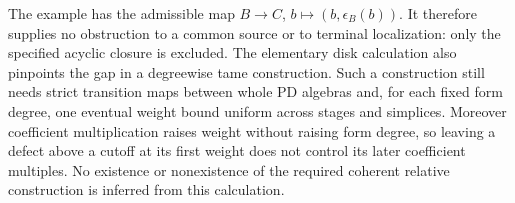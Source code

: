 The example has the admissible map
$B\to C$, $b\mapsto(b,\epsilon_B(b))$.
It therefore supplies no obstruction to a common source
or to terminal localization: only the specified acyclic
closure is excluded. The elementary disk calculation also
pinpoints the gap in a degreewise tame construction. Such a
construction still needs strict transition maps between whole
PD algebras and, for each fixed form degree, one eventual weight
bound uniform across stages and simplices. Moreover coefficient
multiplication raises weight without raising form degree, so
leaving a defect above a cutoff at its first weight does not
control its later coefficient multiples. No existence or
nonexistence of the required coherent relative construction
is inferred from this calculation.
